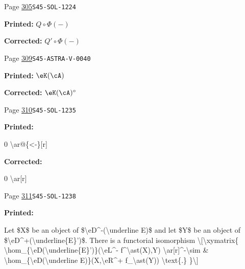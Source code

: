 \begin{description}
\smallskip
\item[\hypertarget{apparatus:EN-0215}{215}] Page \hyperlink{printpage:en:305}{305}\quad\texttt{S45-SOL-1224}
\par\noindent\textbf{Printed:} \(Q\circ \Phi(-)\)
\par\noindent\textbf{Corrected:} \(Q'\circ \Phi(-)\)
\smallskip
\item[\hypertarget{apparatus:EN-0216}{216}] Page \hyperlink{printpage:en:309}{309}\quad\texttt{S45-ASTRA-V-0040}
\par\noindent\textbf{Printed:} \(\eK(\cA)\)
\par\noindent\textbf{Corrected:} \(\eK(\cA)^\circ\)
\smallskip
\item[\hypertarget{apparatus:EN-0217}{217}] Page \hyperlink{printpage:en:310}{310}\quad\texttt{S45-SOL-1235}
\par\noindent\textbf{Printed:} {\footnotesize\ttfamily\raggedright 0 \textbackslash{}\allowbreak{}ar@\{\allowbreak{}<-\allowbreak{}\}\allowbreak{}[\allowbreak{}r]\allowbreak{}\par}
\par\noindent\textbf{Corrected:} {\footnotesize\ttfamily\raggedright 0 \textbackslash{}\allowbreak{}ar[\allowbreak{}r]\allowbreak{}\par}
\smallskip
\item[\hypertarget{apparatus:EN-0218}{218}] Page \hyperlink{printpage:en:311}{311}\quad\texttt{S45-SOL-1238}
\par\noindent\textbf{Printed:} {\footnotesize\ttfamily\raggedright Let \$X\$ be an object of \$\textbackslash{}\allowbreak{}eD\textasciicircum{}\allowbreak{}-\allowbreak{}(\allowbreak{}\textbackslash{}\allowbreak{}underline E)\allowbreak{}\$ and let \$Y\$ be an object of \$\textbackslash{}\allowbreak{}eD\textasciicircum{}\allowbreak{}+\allowbreak{}(\allowbreak{}\textbackslash{}\allowbreak{}underline\{\allowbreak{}E\}\allowbreak{}')\allowbreak{}\$. There is a functorial isomorphism \textbackslash{}\allowbreak{}[\allowbreak{}\textbackslash{}\allowbreak{}xymatrix\{\allowbreak{}   \textbackslash{}\allowbreak{}hom\_\allowbreak{}\{\allowbreak{}\textbackslash{}\allowbreak{}eD(\allowbreak{}\textbackslash{}\allowbreak{}underline\{\allowbreak{}E\}\allowbreak{}')\allowbreak{}\}\allowbreak{}(\allowbreak{}\textbackslash{}\allowbreak{}eL\textasciicircum{}\allowbreak{}-\allowbreak{} f\textasciicircum{}\allowbreak{}\textbackslash{}\allowbreak{}ast(\allowbreak{}X)\allowbreak{},\allowbreak{}Y)\allowbreak{} \textbackslash{}\allowbreak{}ar[\allowbreak{}r]\allowbreak{}\textasciicircum{}\allowbreak{}-\allowbreak{}\textbackslash{}\allowbreak{}sim     \& \textbackslash{}\allowbreak{}hom\_\allowbreak{}\{\allowbreak{}\textbackslash{}\allowbreak{}eD(\allowbreak{}\textbackslash{}\allowbreak{}underline E)\allowbreak{}\}\allowbreak{}(\allowbreak{}X,\allowbreak{}\textbackslash{}\allowbreak{}eR\textasciicircum{}\allowbreak{}+\allowbreak{} f\_\allowbreak{}\textbackslash{}\allowbreak{}ast(\allowbreak{}Y)\allowbreak{})\allowbreak{} \textbackslash{}\allowbreak{}text\{\allowbreak{}.\}\allowbreak{} \}\allowbreak{}\textbackslash{}\allowbreak{}]\allowbreak{}\par}

\end{description}
